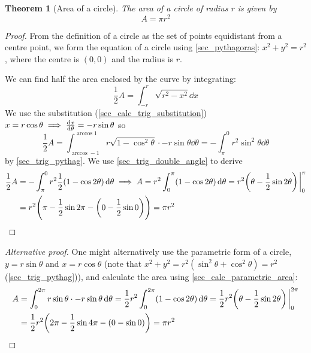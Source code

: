 \documentclass[fleqn,a4paper,11pt]{article}
\newtheorem{theorem}{Theorem}[section]
\begin{document}
    \begin{theorem}[Area of a circle]
    The area of a circle of radius \(r\) is given by
    \begin{equation*}
    A = \pi r^2
    \end{equation*}
    \end{theorem}
    \begin{proof}
    From the definition of a circle as the set of points equidistant from a
    centre point, we form the equation of a circle using \ref{sec_pythagoras}:
    \(x^2 + y^2 = r^2\), where the centre is \((0, 0)\) and the radius is \(r\).

    We can find half the area enclosed by the curve by integrating:
    \begin{equation*}
    \frac 12 A = \int_{-r}^r \sqrt{r^2 - x^2} \dd{x}
    \end{equation*}
    We use the substitution (\ref{sec_calc_trig_substitution})
    \(x = r \cos \theta \implies \dv{x}{\theta} = -r \sin \theta\) so
    \begin{equation*}
    \frac 12 A = \int_{\arccos -1}^{\arccos 1}
        r\sqrt{1 - \cos^2 \theta} \cdot -r \sin \theta \dd{\theta}
      = -\int_\pi^0 r^2 \sin^2 \theta \dd{\theta}
    \end{equation*}
    by \ref{sec_trig_pythag}. We use \ref{sec_trig_double_angle} to derive
    \begin{align*}
    \frac 12 A &= -\int_\pi^0
        r^2 \frac 12 (1 - \cos 2 \theta) \dd{\theta} \implies
     A = r^2 \int_0^\pi (1 - \cos 2 \theta) \dd{\theta} =
     r^2\pqty{\theta - \frac 12 \sin 2 \theta}\eval_0^\pi \\
     &= r^2 \pqty{\pi - \frac 12 \sin 2 \pi -
                   \pqty{0 - \frac 12 \sin 0}} = \pi r^2 \qedhere
    \end{align*}
    \end{proof}
    \begin{proof}[Alternative proof]
    One might alternatively use the parametric form of a circle,
    \(y = r \sin \theta\) and \(x = r \cos \theta\)
    (note that \(x^2 + y^2 = r^2(\sin^2 \theta + \cos^2 \theta) = r^2\)
    (\ref{sec_trig_pythag})), and calculate the area using
    \ref{sec_calc_parametric_area}:
    \begin{align*}
    A &= \int_0^{2\pi}
        r \sin \theta \cdot -r \sin \theta \dd{\theta} =
     \frac 12 r^2 \int_0^{2\pi} (1 - \cos 2 \theta) \dd{\theta} =
     \frac 12 r^2 \pqty{\theta - \frac 12 \sin 2 \theta}\eval_0^{2\pi} \\
     &= \frac 12 r^2 \pqty{2\pi - \frac 12 \sin 4 \pi -
                      \pqty{0 - \sin 0}} = \pi r^2 \qedhere
    \end{align*}
    \end{proof}
\end{document}
